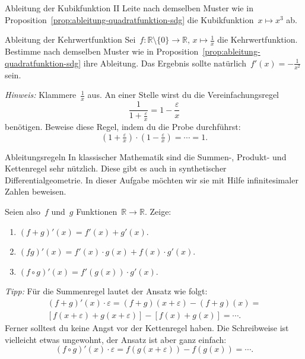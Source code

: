 \documentclass[twoside]{../zirkelblatt}
\newcommand{\RR}{\mathbb{R}}
\theoremstyle{definition}
\theoremstyle{plain}
\theoremstyle{remark}
\begin{document}
\begin{aufgabeShaded}{Ableitung der Kubikfunktion II}
Leite nach demselben Muster wie in
Proposition~\ref{prop:ableitung-quadratfunktion-sdg} die Kubikfunktion~$x
\mapsto x^3$ ab.
\end{aufgabeShaded}

\begin{aufgabeShaded}{Ableitung der Kehrwertfunktion}
Sei~$f : \RR \setminus \{0\} \to \RR,\,x \mapsto \frac{1}{x}$ die
Kehrwertfunktion. Bestimme nach demselben Muster wie in
Proposition~\ref{prop:ableitung-quadratfunktion-sdg} ihre Ableitung.
Das Ergebnis sollte natürlich~$f'(x) = -\frac{1}{x^2}$ sein.

\emph{Hinweis:} Klammere~$\frac{1}{x}$ aus. An einer Stelle wirst du die Vereinfachungsregel
\[ \frac{1}{1 + \frac{\varepsilon}{x}} = 1 - \frac{\varepsilon}{x} \]
benötigen.\footnotemark{}
Beweise diese Regel, indem du die Probe durchführst:
\[ (1 + \tfrac{\varepsilon}{x}) \cdot (1 - \tfrac{\varepsilon}{x}) = \cdots = 1. \]
\vspace{-1.5em}%
\end{aufgabeShaded}

\begin{aufgabeShaded}{Ableitungsregeln}
In klassischer Mathematik sind die Summen-, Produkt- und Kettenregel sehr
nützlich. Diese gibt es auch in synthetischer Differentialgeometrie. In dieser
Aufgabe möchten wir sie mit Hilfe infinitesimaler Zahlen beweisen.

Seien also~$f$ und~$g$ Funktionen~$\RR \to \RR$. Zeige:
\begin{enumerate}
\item $(f+g)'(x) = f'(x) + g'(x)$.
\item $(fg)'(x) = f'(x) \cdot g(x) + f(x) \cdot g'(x)$.
\item $(f \circ g)'(x) = f'(g(x)) \cdot g'(x)$.
\end{enumerate}

\emph{Tipp:} Für die Summenregel lautet der Ansatz wie folgt:
\begin{multline*}(f+g)'(x) \cdot \varepsilon =
  (f+g)(x + \varepsilon) - (f+g)(x) = \\
  [f(x+\varepsilon) + g(x+\varepsilon)] - [f(x) + g(x)] = \cdots. \end{multline*}
Ferner solltest du keine Angst vor der Kettenregel haben. Die Schreibweise ist
vielleicht etwas ungewohnt, der Ansatz ist aber ganz einfach:
\[ (f \circ g)'(x) \cdot \varepsilon =
  f(g(x + \varepsilon)) - f(g(x)) = \cdots. \]
\vspace{-1.5em}%
\end{aufgabeShaded}
\end{document}
